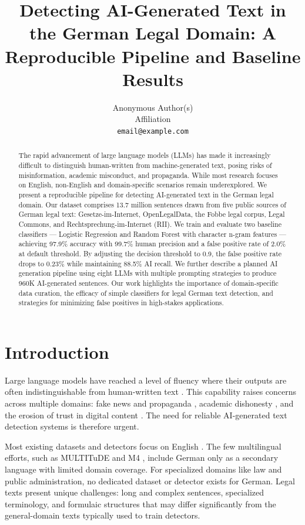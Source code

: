 \documentclass[11pt,a4paper]{article}
\title{Detecting AI-Generated Text in the German Legal Domain:
A Reproducible Pipeline and Baseline Results}
\author{Anonymous Author(s) \\
  Affiliation \\
  \texttt{email@example.com}}
\begin{document}
\maketitle

\begin{abstract}
The rapid advancement of large language models (LLMs) has made it increasingly difficult to distinguish human-written from machine-generated text, posing risks of misinformation, academic misconduct, and propaganda. While most research focuses on English, non-English and domain-specific scenarios remain underexplored. We present a reproducible pipeline for detecting AI-generated text in the German legal domain. Our dataset comprises 13.7 million sentences drawn from five public sources of German legal text: Gesetze-im-Internet, OpenLegalData, the Fobbe legal corpus, Legal Commons, and Rechtsprechung-im-Internet (RII). We train and evaluate two baseline classifiers --- Logistic Regression and Random Forest with character n-gram features --- achieving 97.9\% accuracy with 99.7\% human precision and a false positive rate of 2.0\% at default threshold. By adjusting the decision threshold to 0.9, the false positive rate drops to 0.23\% while maintaining 88.5\% AI recall. We further describe a planned AI generation pipeline using eight LLMs with multiple prompting strategies to produce 960K AI-generated sentences. Our work highlights the importance of domain-specific data curation, the efficacy of simple classifiers for legal German text detection, and strategies for minimizing false positives in high-stakes applications.
\end{abstract}

\section{Introduction}

Large language models have reached a level of fluency where their outputs are often indistinguishable from human-written text \cite{wu2025survey}. This capability raises concerns across multiple domains: fake news and propaganda \cite{zellers2019grover}, academic dishonesty \cite{weber2023testing}, and the erosion of trust in digital content \cite{tang2024science}. The need for reliable AI-generated text detection systems is therefore urgent.

Most existing datasets and detectors focus on English \cite{ghosal2023survey, crothers2023machine}. The few multilingual efforts, such as MULTITuDE \cite{macko2023multitude} and M4 \cite{wang2024m4}, include German only as a secondary language with limited domain coverage. For specialized domains like law and public administration, no dedicated dataset or detector exists for German. Legal texts present unique challenges: long and complex sentences, specialized terminology, and formulaic structures that may differ significantly from the general-domain texts typically used to train detectors.
\end{document}
